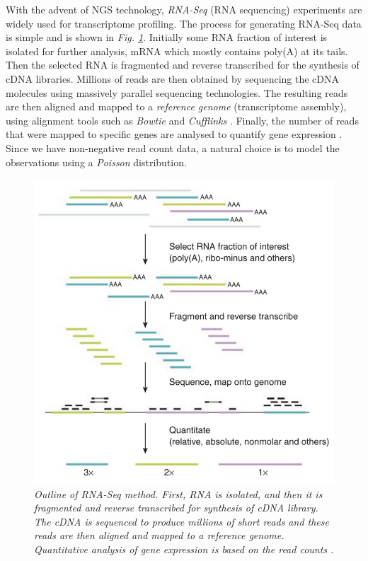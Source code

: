 With the advent of NGS technology, \emph{RNA-Seq} (RNA sequencing) experiments \citep{Wang2009} are widely used for transcriptome profiling. The process for generating RNA-Seq data is simple and is shown in \emph{Fig. \ref{rnaSeq-pic}}. Initially some RNA fraction of interest is isolated for further analysis, \eg mRNA which mostly contains poly(A) at its tails. Then the selected RNA is fragmented and reverse transcribed for the synthesis of cDNA libraries. Millions of reads are then obtained by sequencing the cDNA molecules using massively parallel sequencing technologies. The resulting reads are then aligned and mapped to a \emph{reference genome} (\ie transcriptome assembly), using alignment tools such as \emph{Bowtie} \citep{Langmead2009} and \emph{Cufflinks} \citep{Trapnell2010}. Finally, the number of reads that were mapped to specific genes are analysed to quantify gene expression \citep{Pepke2009}. Since we have non-negative read count data, a natural choice is to model the observations using a \emph{Poisson} distribution.
\begin{figure}[!ht]
\begin{center}
 \includegraphics[scale = 0.37]{images/rna-seq}
\caption{\emph{Outline of RNA-Seq method. First, RNA is isolated, and then it is fragmented and reverse transcribed for synthesis of cDNA library. The cDNA is sequenced to produce millions of short reads and these reads are then aligned and mapped to a reference genome. Quantitative analysis of gene expression is based on the read counts \citep{Pepke2009}.}}
\label{rnaSeq-pic}
\end{center}
\end{figure}

